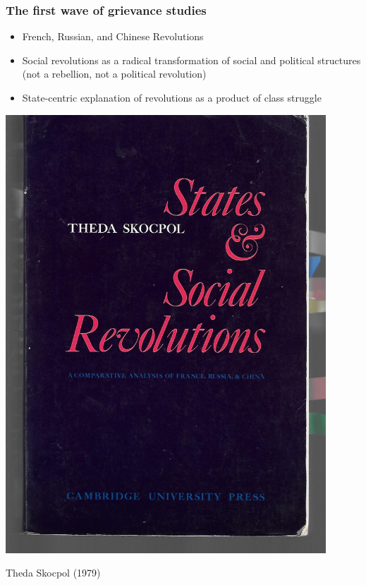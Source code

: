 \documentclass[utf8, xcolor=dvipsnames]{beamer}
\begin{document}
\begin{frame}
\frametitle{The first wave of grievance studies}
\centering

\begin{minipage}{0.59\textwidth}\centering
\begin{itemize}
  \item French, Russian, and Chinese Revolutions
  \item Social revolutions as a radical transformation of social and political structures (not a rebellion, not a political revolution)
  \item State-centric explanation of revolutions as a product of class struggle
\end{itemize}
\end{minipage}\hfill
\begin{minipage}{0.4\textwidth}\centering
\includegraphics[width = 0.9\textwidth]{img/skocpol}

Theda Skocpol (1979)
\end{minipage}

\end{frame}
\end{document}

